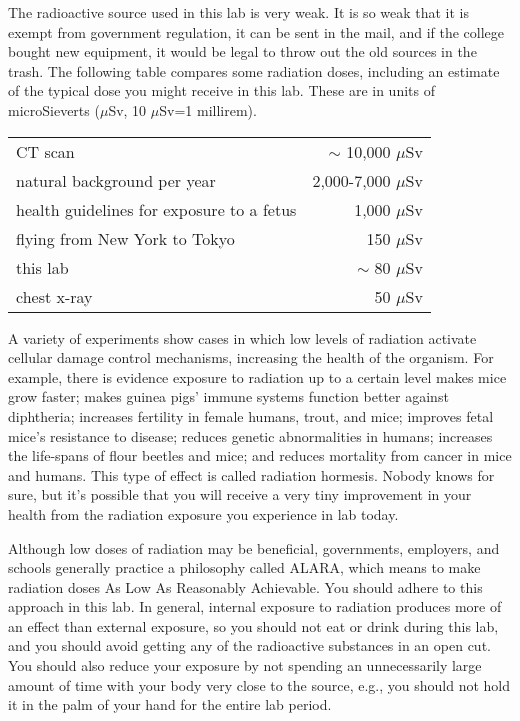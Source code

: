 \newcommand{\mus}{$\mu$Sv}

The radioactive source used in this lab is very
weak. It is so weak that it is exempt from government
regulation, it can be sent in the mail, and if the college bought new equipment, it would
be legal to throw out the old sources in the trash.
The following table compares some radiation doses, including an estimate of the typical dose
you might receive in this lab. These are in units of microSieverts (\mus, 10 \mus=1 millirem).


\begin{tabular}{p{50mm}r}
  CT scan                                    & $\sim$ 10,000 \mus \\
  natural background per year                & 2,000-7,000 \mus \\
  health guidelines for exposure to a fetus  & 1,000 \mus \\
  flying from New York to Tokyo              & 150 \mus \\
  this lab                                   & $\sim$ 80 \mus \\
  chest x-ray                                & 50 \mus
\end{tabular}

A variety of experiments show cases in which
low levels of radiation activate cellular damage control mechanisms, increasing
the health of the organism. For example, there is evidence exposure to radiation up to a certain level makes mice grow
faster; makes guinea pigs' immune systems function better against diphtheria; increases fertility in female humans, trout, and mice;
improves fetal mice's resistance to disease; reduces genetic abnormalities in humans;
increases the life-spans of flour beetles and mice; and reduces mortality from cancer in mice and humans.
This type of effect is called radiation
hormesis. Nobody knows for sure, but it's possible that you will receive a very tiny improvement in your health from the radiation exposure
you experience in lab today.

Although low doses of radiation may be beneficial, 
governments, employers, and schools generally practice a philosophy called
ALARA, which means to make radiation doses As Low As Reasonably Achievable.
You should adhere to this approach in this lab.
In general, internal exposure to radiation produces more of an effect than external
exposure, so you should not eat or drink during this lab, and
you should avoid getting any of the radioactive substances in an
open cut. You should also reduce your exposure by not spending an unnecessarily large amount of time
with your body very close to the source, e.g., you should not hold it in the palm of your hand
for the entire lab period.

